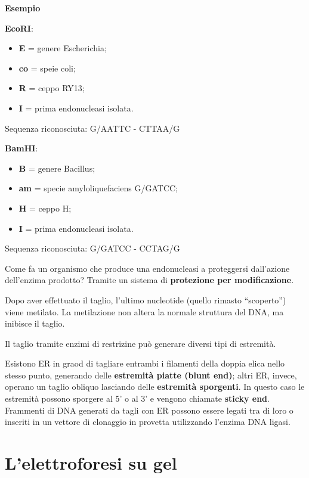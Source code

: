 \documentclass[11pt]{book}
\begin{document}
\textbf{Esempio}

\textbf{EcoRI}:

\begin{itemize}
\itemsep1pt\parskip0pt
\item
  \textbf{E} = genere Escherichia;
\item
  \textbf{co} = speie coli;
\item
  \textbf{R} = ceppo RY13;
\item
  \textbf{I} = prima endonucleasi isolata.
\end{itemize}

Sequenza riconosciuta: G/AATTC - CTTAA/G

\textbf{BamHI}:

\begin{itemize}
\itemsep1pt\parskip0pt
\item
  \textbf{B} = genere Bacillus;
\item
  \textbf{am} = specie amyloliquefaciens G/GATCC;
\item
  \textbf{H} = ceppo H;
\item
  \textbf{I} = prima endonucleasi isolata.
\end{itemize}

Sequenza riconosciuta: G/GATCC - CCTAG/G

Come fa un organismo che produce una endonucleasi a proteggersi
dall'azione dell'enzima prodotto? Tramite un sistema di
\textbf{protezione per modificazione}.

Dopo aver effettuato il taglio, l'ultimo nucleotide (quello rimasto
``scoperto'') viene metilato. La metilazione non altera la normale
struttura del DNA, ma inibisce il taglio.

Il taglio tramite enzimi di restrizine può generare diversi tipi di
estremità.

Esistono ER in graod di tagliare entrambi i filamenti della doppia elica
nello stesso punto, generando delle \textbf{estremità piatte (blunt
end)}; altri ER, invece, operano un taglio obliquo lasciando delle
\textbf{estremità sporgenti}. In questo caso le estremità possono
sporgere al 5' o al 3' e vengono chiamate \textbf{sticky end}. Frammenti
di DNA generati da tagli con ER possono essere legati tra di loro o
inseriti in un vettore di clonaggio in provetta utilizzando l'enzima DNA
ligasi.

\section{L'elettroforesi su gel}\label{lelettroforesi-su-gel}
\end{document}
